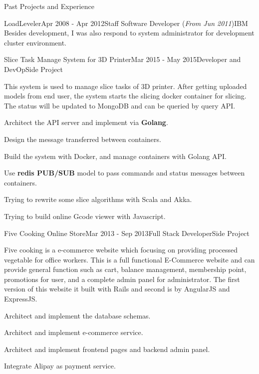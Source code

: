 \documentclass{resume} %
\begin{document}
\begin{rSection}{Past Projects and Experience}
\begin{rSubsection}{LoadLeveler}{Apr 2008 - Apr 2012}{Staff Software Developer (\textit{From Jun 2011})}{IBM}
Besides development, I was also respond to system administrator for development cluster environment.
\end{rSubsection}
\vspace{1.8em}



\begin{rSubsection}{Slice Task Manage System for 3D Printer}{Mar 2015 - May 2015}{Developer and DevOp}{Side Project}

This system is used to manage slice tasks of 3D printer. After getting uploaded models from end user, the system starts the slicing docker container for slicing. The status will be updated to MongoDB and can be queried by query API.

\begin{rSubsectionList}
\item Architect the API server and implement via { \bf Golang}.
\item Design the message transferred between containers.
\item Build the system with Docker, and manage containers with Golang API.
\item Use { \bf redis PUB/SUB } model to pass commands and status messages between containers.
\item Trying to rewrite some slice algorithms with Scala and Akka.
\item Trying to build online Gcode viewer with Javascript.
\end{rSubsectionList}
\end{rSubsection}


\begin{rSubsection}{Five Cooking Online Store}{Mar 2013 - Sep 2013}{Full Stack Developer}{Side Project}

Five cooking is a e-commerce website which focusing on providing processed vegetable for office workers. This is a full functional E-Commerce website and can provide general function such as cart, balance management, membership point, promotions for user, and a complete admin panel for administrator. The first version of this website it built with Rails and second is by AngularJS and ExpressJS.

\begin{rSubsectionList}
\item Architect and implement the database schemas.
\item Architect and implement e-commerce service.
\item Architect and implement frontend pages and backend admin panel.
\item Integrate Alipay as payment service.
\end{rSubsectionList}
\end{rSubsection}



\end{rSection}

\thispagestyle{fancy}
\end{document}
